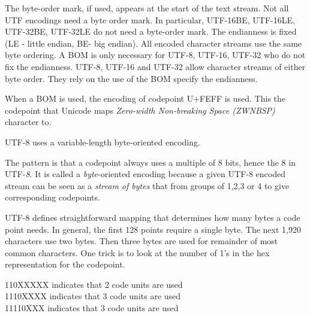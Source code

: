 
The byte-order mark, if used, appears at the start of the text stream. Not all UTF encodings need a 
byte order mark. In particular, UTF-16BE, UTF-16LE, UTF-32BE, UTF-32LE do not need 
a byte-order mark. The endianness is fixed (LE - little endian, BE- big endian).
All encoded character streams use the same byte ordering. 
A BOM is only necessary for UTF-8, UTF-16, UTF-32 who do not fix the endianness.
UTF-8,  UTF-16 and UTF-32 allow character streams of either byte order.  
They rely on the use of the BOM specify the endianness.


When a BOM is used, the encoding of codepoint U+FEFF is used. 
This the codepoint that Unicode maps \textit{Zero-width Non-breaking Space (ZWNBSP)} 
character to. 

\frmrule 





\frmrule 

UTF-8 uses a variable-length byte-oriented encoding. 

The pattern is that a codepoint always uses a multiple of 8 bits, hence the 8 in UTF-\textit{8}. 
It is called a \textit{byte}-oriented encoding because a given UTF-8 encoded 
stream can be seen as a \textit{stream of bytes} that from groups of 1,2,3 or 4 to give 
corresponding codepoints.  



UTF-8 defines straightforward mapping that determines how many bytes a code point 
needs. In general, the first 128 points require a single byte.
The next 1,920 characters use two bytes. Then three bytes are used 
for remainder of most common characters. One trick is to look at the number of 
1's in the hex representation for the codepoint. 

110XXXXX indicates that 2 code units are used\\
1110XXXX indicates that 3 code units are used\\
11110XXX indicates that 3 code units are used\\


